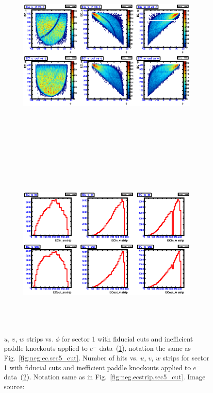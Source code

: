 \begin{figure}[!ht]
  \centering
  \begin{subfigure}[b]{\figwidth}
  \includegraphics[width=\figwidth, height=3.5in,valign=c]{figures/calib/ec/pim_ecuvw_phi_afterGeoFid_sec1.eps}\caption{}\label{fig:EC_III_I}
  \end{subfigure}%
  \\
  \begin{subfigure}[b]{\figwidth}
  \includegraphics[width=\figwidth, height=3.5in,valign=c]{figures/calib/ec/pim_ecuvw_afterGeoFid_sec1.eps}\caption{}\label{fig:EC_IV_I}
  \end{subfigure}%
      \caption { $u$, $v$, $w$ strips vs. $\phi$ for sector 1 with fiducial cuts and inefficient paddle knockouts applied to $e^-$ data~(\ref{fig:EC_III_I}), notation the same as Fig.~\ref{fig:neg:ec.sec5_cut}. Number of hits vs.  $u$, $v$, $w$ strips for sector 1 with fiducial cuts and inefficient paddle knockouts applied to $e^-$ data~(\ref{fig:EC_IV_I}). Notation same as in Fig.~\ref{fig:neg.ecstrip.sec5_cut}. Image source:~\cite{clas.thesis.kunkel}}
        \label{fig:EC_cut_I}
\end{figure}



